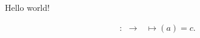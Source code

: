 \documentclass[12pt]{article}
\begin{document}
Hello world!

\begin{align*}
  : &\longrightarrow  \
  &\longmapsto (a) = c
.\end{align*}
\end{document}
